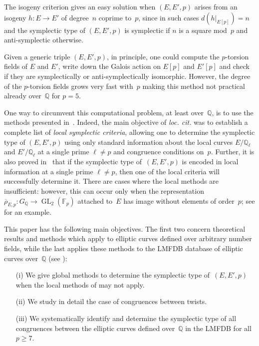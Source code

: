 \documentclass[12pt, reqno]{amsart}
\newcommand{\Fp}{\mathbb{F}_p}
\newcommand{\Q}{\mathbb{Q}}
\newcommand{\rhobar}{{\overline{\rho}}}
\newcommand{\GL}{\operatorname{GL}}
\numberwithin{equation}{section}
\theoremstyle{definition}
\theoremstyle{remark}
\begin{document}
The isogeny criterion gives an easy solution when $(E,E',p)$
arises from an isogeny $h \colon E \to E'$ of degree~$n$ coprime
to~$p$, since in such cases $d(h|_{E[p]}) = n$ and the symplectic type
of $(E,E',p)$ is symplectic if $n$ is a square mod~$p$ and
anti-symplectic otherwise.

Given a generic triple $(E, E', p)$, in principle, one
could compute the $p$-torsion fields of $E$ and $E'$,
write down the Galois action on $E[p]$ and $E'[p]$ and check if they
are symplectically or anti-symplectically isomorphic. However, the
degree of the $p$-torsion fields grows very fast with~$p$ making this
method not practical already over~$\Q$ for $p = 5$.

One way to circumvent this computational problem, at least over~$\Q$, is to use the methods
presented in~\cite{FKSym}. Indeed, the main objective of {\it loc. cit.} was to establish a complete list of {\em local symplectic criteria},
allowing one to determine the symplectic type of $(E,E',p)$ using only
standard information about the local curves $E/\Q_\ell$ and
$E'/\Q_\ell$ at a single prime $\ell \neq p$ and congruence conditions
on~$p$. Further, it is also proved in~\cite{FKSym}  that if the
symplectic type of~$(E,E',p)$ is encoded in local information at a
single prime $\ell \neq p$, then one of the local criteria will
successfully determine it.  
There are cases where the local methods
are insufficient: however, this can occur only when 
the representation~$\rhobar_{E,p} : G_\Q \to \GL_2(\Fp)$ attached to~$E$ 
has image without elements of order~$p$;
see \cite[Proposition~16]{FKSym} for an example.

This paper has the following main objectives. The first two concern
theoretical results and methods which apply to elliptic curves defined
over arbitrary number fields, while the last applies these methods to
the LMFDB database of elliptic curves over~$\Q$ (see \cite{lmfdb}):
\begin{itemize}
 \item[(i)] We give global methods to determine the symplectic type
   of~$(E,E',p)$ when the local methods of \cite{FKSym} may not apply.
 \item[(ii)] We study in detail the case of congruences between twists.
\item[(iii)] We systematically identify and determine the symplectic
  type of all congruences between the elliptic curves defined
  over~$\Q$ in the LMFDB for all~$p\ge7$.
\end{itemize}
\end{document}
